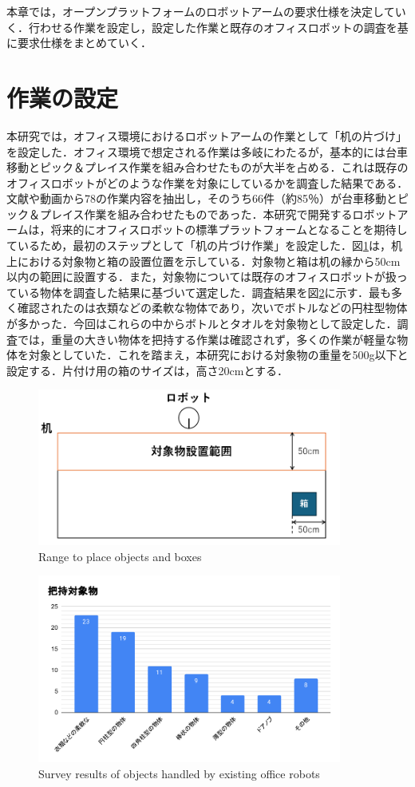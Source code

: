 本章では，オープンプラットフォームのロボットアームの要求仕様を決定していく．行わせる作業を設定し，設定した作業と既存のオフィスロボットの調査を基に要求仕様をまとめていく．
\section{作業の設定}
本研究では，オフィス環境におけるロボットアームの作業として「机の片づけ」を設定した．オフィス環境で想定される作業は多岐にわたるが，基本的には台車移動とピック＆プレイス作業を組み合わせたものが大半を占める．これは既存のオフィスロボットがどのような作業を対象にしているかを調査した結果である．文献や動画から78の作業内容を抽出し，そのうち66件（約85％）が台車移動とピック＆プレイス作業を組み合わせたものであった．本研究で開発するロボットアームは，将来的にオフィスロボットの標準プラットフォームとなることを期待しているため，最初のステップとして「机の片づけ作業」を設定した．図\ref{fig:range}は，机上における対象物と箱の設置位置を示している．対象物と箱は机の縁から50cm以内の範囲に設置する．また，対象物については既存のオフィスロボットが扱っている物体を調査した結果に基づいて選定した．調査結果を図\ref{fig:handget}に示す．最も多く確認されたのは衣類などの柔軟な物体であり，次いでボトルなどの円柱型物体が多かった．今回はこれらの中からボトルとタオルを対象物として設定した．調査では，重量の大きい物体を把持する作業は確認されず，多くの作業が軽量な物体を対象としていた．これを踏まえ，本研究における対象物の重量を500g以下と設定する．片付け用の箱のサイズは，高さ20cmとする．
\begin{figure}[h]
  \centering
  \includegraphics[width=10cm]{images/range.png}
  \caption{Range to place objects and boxes}
  \label{fig:range}
\end{figure}
\begin{figure}[h]
  \centering
  \includegraphics[width=10cm]{images/handget.pdf}
  \caption{Survey results of objects handled by existing office robots}
  \label{fig:handget}
\end{figure}
\clearpage
\newpage